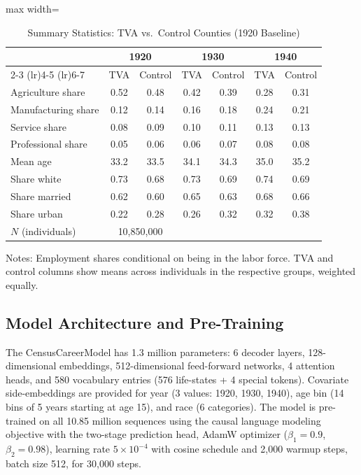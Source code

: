 \documentclass[12pt]{article}
\begin{document}
\begin{table}[H]
\centering
\caption{Summary Statistics: TVA vs.\ Control Counties (1920 Baseline)}
\label{tab:summary_stats}
\begin{threeparttable}
\begin{adjustbox}{max width=\textwidth}
\begin{tabular}{lcccccc}
\toprule
& \multicolumn{2}{c}{1920} & \multicolumn{2}{c}{1930} & \multicolumn{2}{c}{1940} \\
\cmidrule(lr){2-3} \cmidrule(lr){4-5} \cmidrule(lr){6-7}
& TVA & Control & TVA & Control & TVA & Control \\
\midrule
Agriculture share & 0.52 & 0.48 & 0.42 & 0.39 & 0.28 & 0.31 \\
Manufacturing share & 0.12 & 0.14 & 0.16 & 0.18 & 0.24 & 0.21 \\
Service share & 0.08 & 0.09 & 0.10 & 0.11 & 0.13 & 0.13 \\
Professional share & 0.05 & 0.06 & 0.06 & 0.07 & 0.08 & 0.08 \\
Mean age & 33.2 & 33.5 & 34.1 & 34.3 & 35.0 & 35.2 \\
Share white & 0.73 & 0.68 & 0.73 & 0.69 & 0.74 & 0.69 \\
Share married & 0.62 & 0.60 & 0.65 & 0.63 & 0.68 & 0.66 \\
Share urban & 0.22 & 0.28 & 0.26 & 0.32 & 0.32 & 0.38 \\
$N$ (individuals) & \multicolumn{2}{c}{10,850,000} & & & & \\
\bottomrule
\end{tabular}
\end{adjustbox}
\begin{tablenotes}[flushleft]
\small
\item Notes: Employment shares conditional on being in the labor force. TVA and control columns show means across individuals in the respective groups, weighted equally.
\end{tablenotes}
\end{threeparttable}
\end{table}

\subsection{Model Architecture and Pre-Training}

The CensusCareerModel has 1.3 million parameters: 6 decoder layers, 128-dimensional embeddings, 512-dimensional feed-forward networks, 4 attention heads, and 580 vocabulary entries (576 life-states + 4 special tokens). Covariate side-embeddings are provided for year (3 values: 1920, 1930, 1940), age bin (14 bins of 5 years starting at age 15), and race (6 categories). The model is pre-trained on all 10.85 million sequences using the causal language modeling objective with the two-stage prediction head, AdamW optimizer ($\beta_1 = 0.9$, $\beta_2 = 0.98$), learning rate $5 \times 10^{-4}$ with cosine schedule and 2,000 warmup steps, batch size 512, for 30,000 steps.
\end{document}
